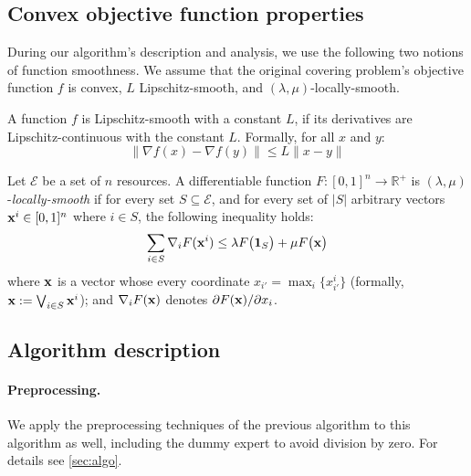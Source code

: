 \subsection{Convex objective function properties} \label{sec:f-properties}

During our algorithm's description and analysis, we use the following two notions of function smoothness. We assume that the original covering problem's objective function $f$ is convex, $L$ Lipschitz-smooth, and $(\lambda, \mu)$-locally-smooth.

\begin{definition}
    A function $f$ is Lipschitz-smooth with a constant $L$, if its derivatives are Lipschitz-continuous with the constant $L$. Formally, for all $x$ and $y$:
    \[\|\nabla f(x) - \nabla f(y)\| \le L \|x - y\|\]
\end{definition}

\begin{definition}
    Let $\mathcal{E}$ be a set of $n$ resources.
    A differentiable function $F: [0,1]^{n} \rightarrow \mathbb{R}^{+}$ is $(\lambda,\mu)$-\emph{locally-smooth}
    if for every set $S \subseteq \mathcal{E}$, and for every set of $|S|$ arbitrary vectors $\mathbf{x}^{i} \in [0,1]^{n}$ where $i \in S$, the following inequality holds:
    \begin{equation*}	\label{eq:min-local-smooth}
    \sum_{i \in S} \nabla_{i} F(\mathbf{x}^{i}) \leq \lambda F\bigl( \mathbf{1}_{S} \bigr) + \mu F\bigl( \mathbf{x} \bigr)
    \end{equation*}
    where $\mathbf{x}$ is a vector whose every coordinate $x_{i'} = \max_{i}\{x^{i}_{i'}\}$ (formally, $\mathbf{x} := \bigvee_{i \in S} \mathbf{x}^{i}$);
    and $\nabla_{i} F(\mathbf{x})$ denotes $\partial F(\mathbf{x})/\partial x_{i}$.
\end{definition}

\subsection{Algorithm description}

\paragraph{Preprocessing.} We apply the preprocessing techniques of the previous algorithm to this algorithm as well, including the dummy expert to avoid division by zero. For details see \cref{sec:algo}.

